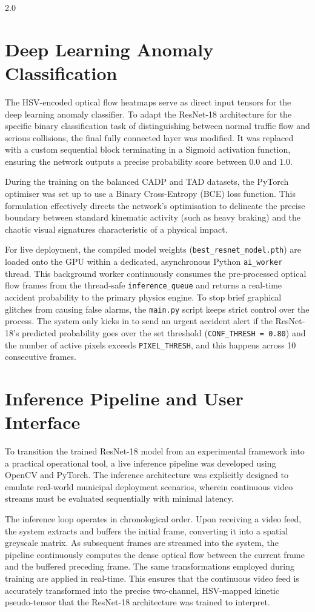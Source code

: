 \begin{spacing}{2.0}
\section{Deep Learning Anomaly Classification}
The HSV-encoded optical flow heatmaps serve as direct input tensors for the deep learning anomaly classifier. To adapt the ResNet-18 architecture for the specific binary classification task of distinguishing between normal traffic flow and serious collisions, the final fully connected layer was modified. It was replaced with a custom sequential block terminating in a Sigmoid activation function, ensuring the network outputs a precise probability score between 0.0 and 1.0.

During the training on the balanced CADP and TAD datasets, the PyTorch optimiser was set up to use a Binary Cross-Entropy (BCE) loss function. This formulation effectively directs the network's optimisation to delineate the precise boundary between standard kinematic activity (such as heavy braking) and the chaotic visual signatures characteristic of a physical impact.

For live deployment, the compiled model weights (\texttt{best\_resnet\_model.pth}) are loaded onto the GPU within a dedicated, asynchronous Python \texttt{ai\_worker} thread. This background worker continuously consumes the pre-processed optical flow frames from the thread-safe \texttt{inference\_queue} and returns a real-time accident probability to the primary physics engine. To stop brief graphical glitches from causing false alarms, the \texttt{main.py} script keeps strict control over the process. The system only kicks in to send an urgent accident alert if the ResNet-18's predicted probability goes over the set threshold (\texttt{CONF\_THRESH = 0.80}) and the number of active pixels exceeds \texttt{PIXEL\_THRESH}, and this happens across 10 consecutive frames.

\section{Inference Pipeline and User Interface}
To transition the trained ResNet-18 model from an experimental framework into a practical operational tool, a live inference pipeline was developed using OpenCV and PyTorch. The inference architecture was explicitly designed to emulate real-world municipal deployment scenarios, wherein continuous video streams must be evaluated sequentially with minimal latency.

The inference loop operates in chronological order. Upon receiving a video feed, the system extracts and buffers the initial frame, converting it into a spatial greyscale matrix. As subsequent frames are streamed into the system, the pipeline continuously computes the dense optical flow between the current frame and the buffered preceding frame. The same transformations employed during training are applied in real-time. This ensures that the continuous video feed is accurately transformed into the precise two-channel, HSV-mapped kinetic pseudo-tensor that the ResNet-18 architecture was trained to interpret.


\end{spacing}
